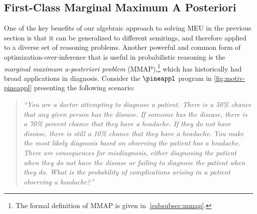 \subsection{First-Class Marginal Maximum A Posteriori}\label{subsec:pineappl-overview}


One of the key benefits of our algebraic approach to solving MEU in the previous
section is that it can be generalized to different semirings, and therefore applied
to a diverse set of reasoning problems.
Another powerful and common form of optimization-over-inference that is useful in
probabilistic reasoning is the \emph{marginal maximum a-posteriori problem} (MMAP),\footnote{The formal definition of MMAP is given
in~\cref{subsubsec:mmap}.}
which has historically had broad applications in diagnosis.
Consider the $\pineappl$ program
in \cref{fig:motiv-pineappl} presenting the following scenario:

\begin{quote}
\textit{``You are a doctor attempting to diagnose a patient. There is a 50\% chance that any given person has the disease.  If someone has the
disease, there is a 70\% percent chance that they have a headache. If
they do not have disease, there is still a 10\% chance that they have
a headache. You make the most likely diagnosis based on observing the
patient has a headache. There are consequences for misdiagnosis, either
diagnosing the patient when they do not have the disease or failing to
diagnose the patient when they do. What is the probability of complications
arising in a patient observing a headache?''}
\end{quote}

